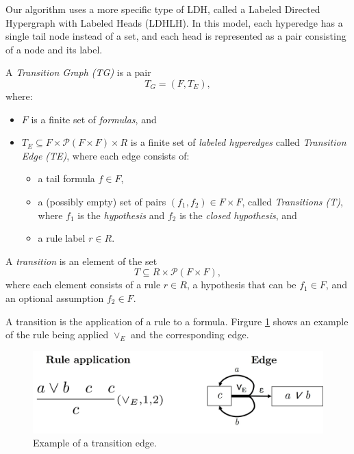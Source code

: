 \documentclass[runningheads]{llncs}
\begin{document}
Our algorithm uses a more specific type of LDH, called a Labeled Directed Hypergraph with Labeled Heads (LDHLH). In this model, each hyperedge has a single tail node instead of a set, and each head is represented as a pair consisting of a node and its label.

\begin{definition}
A \emph{Transition Graph (TG)} is a pair
\[
T_G = (F, T_E),
\]
where:
\begin{itemize}
  \item \( F \) is a finite set of \emph{formulas}, and
  \item \( T_E \subseteq F \times \mathcal{P}(F \times F) \times R \) is a finite set of \emph{labeled hyperedges} called \emph{Transition Edge (TE)}, where each edge consists of:
  \begin{itemize}
    \item a tail formula \( f \in F \),
    \item a (possibly empty) set of pairs \( (f_1, f_2) \in F \times F \), called \emph{Transitions (T)}, where \( f_1 \) is the \emph{hypothesis} and \( f_2 \) is the \emph{closed hypothesis}, and
    \item a rule label \( r \in R \).
  \end{itemize}
\end{itemize}
\end{definition}



\begin{definition}
A \emph{transition} is an element of the set
\[
T \subseteq R \times \mathcal{P}(F \times F),
\]
where each element consists of a rule \( r \in R \), a hypothesis that can be \( f_1 \in F \), and an optional assumption \( f_2 \in F \).
\end{definition}

A transition is the application of a rule to a formula. Firgure \ref{fig:te-ex} shows an example of the rule being applied \(\vee_E\) and the corresponding edge.

    \begin{figure}
        \centering
        \includegraphics[width=0.8\linewidth]{resources/te-example.jpg}
        \caption{Example of a transition edge.}
        \label{fig:te-ex}
    \end{figure}
\end{document}
